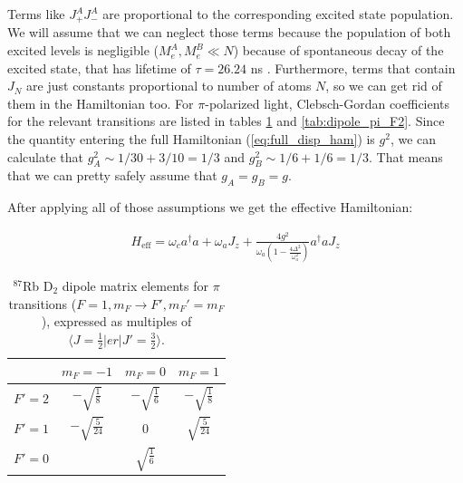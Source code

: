 \documentclass{article}
\numberwithin{equation}{section}
\begin{document}
Terms like $J_{+}^A J_{-}^A$ are proportional to the corresponding excited state population. We will assume that we can neglect those terms because the population of both excited levels is negligible ($M_e^A, M_e^B \ll N$) because of spontaneous decay of the excited state, that has lifetime of $\tau = 26.24$ ns \cite{Steck2003}. Furthermore, terms that contain $J_N$ are just constants proportional to number of atoms $N$, so we can get rid of them in the Hamiltonian too. For $\pi$-polarized light, Clebsch-Gordan coefficients for the relevant transitions are listed in tables \ref{tab:dipole_pi_F1} and \ref{tab:dipole_pi_F2}. Since the quantity entering the full Hamiltonian (\ref{eq:full_disp_ham}) is $g^2$, we can calculate that $g_A^2  \sim 1/30 + 3/10 =  1/3$ and $g_B^2 \sim  1/6 + 1/6 =   1/3$. That means that we can pretty safely assume that $g_A = g_B = g$. 

After applying all of those assumptions we get the effective Hamiltonian:

\begin{gather}
    H_\text{eff} = \omega_c a^\dagger a + \omega_a J_z + \frac{4 g^2}{\omega_a (1-\frac{4 \Delta^2}{\omega_a^2})} a^\dagger a J_z
\end{gather}

\begin{table}[ht]
    \renewcommand{\arraystretch}{2}
    \centering
    \caption{$^{87}$Rb D$_2$ dipole matrix elements for $\pi$ transitions
    ($F=1,m_F\rightarrow F',m_F'=m_F$), expressed as multiples of
    $\langle J=\tfrac12 | er | J'=\tfrac32\rangle$.}
    \begin{tabular}{|c|c|c|c|}
        \hline
        & $m_F=-1$ & $m_F=0$ & $m_F=1$ \\
        \hline
        $F'=2$
        & $-\sqrt{\frac{1}{8}}$
        & $-\sqrt{\frac{1}{6}}$
        & $-\sqrt{\frac{1}{8}}$ \\
        \hline
        $F'=1$
        & $-\sqrt{\frac{5}{24}}$
        & $0$
        & $\sqrt{\frac{5}{24}}$ \\
        \hline
        $F'=0$
        & 
        & $\sqrt{\frac{1}{6}}$
        & \\
        \hline
    \end{tabular}
    \label{tab:dipole_pi_F1}
\end{table}
\end{document}
